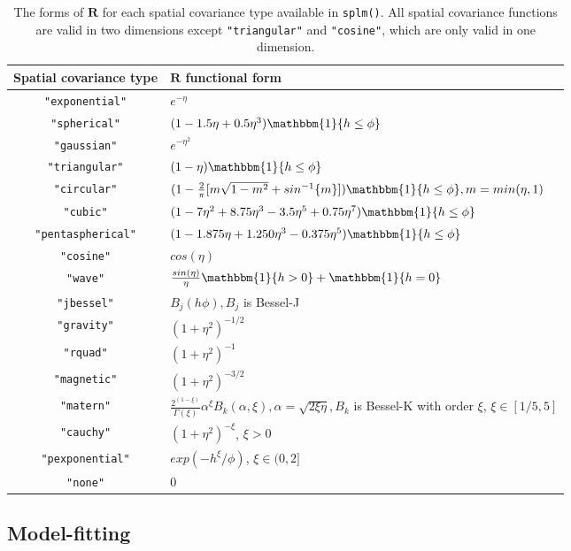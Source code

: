\documentclass[10pt,letterpaper]{article}
\begin{document}
\begin{table}
  \centering
  \begin{tabular}{c|l}
  \hline
  Spatial covariance type & $\mathbf{R}$ functional form \\
  \hline
  \texttt{"exponential"} & $e^{-\eta}$ \\
  \texttt{"spherical"} & $(1 - 1.5\eta + 0.5\eta^3)\mathbbm{1}\{h \leq \phi \}$ \\
  \texttt{"gaussian"} & $e^{-\eta^2}$ \\
  \texttt{"triangular"} & $(1 - \eta)\mathbbm{1}\{h \leq \phi \}$ \\
  \texttt{"circular"} & $(1 - \frac{2}{\pi}[m\sqrt{1 - m^2} + sin^{-1}\{m\}])\mathbbm{1}\{h \leq \phi \}, m = min(\eta, 1)$ \\
  \texttt{"cubic"} & $(1 - 7\eta^2 + 8.75\eta^3 - 3.5\eta^5 + 0.75 \eta^7)\mathbbm{1}\{h \leq \phi \}$ \\
  \texttt{"pentaspherical"} & $(1 - 1.875\eta + 1.250\eta^3 - 0.375\eta^5)\mathbbm{1}\{h \leq \phi \}$ \\
  \texttt{"cosine"} & $ cos(\eta) $ \\
  \texttt{"wave"} & $\frac{sin(\eta)}{\eta}\mathbbm{1}\{h > 0 \} + \mathbbm{1}\{h = 0 \}$ \\
  \texttt{"jbessel"} & $B_j(h\phi), B_j$ is Bessel-J \\
  \texttt{"gravity"} & $(1 + \eta^2)^{-1/2}$ \\
  \texttt{"rquad"} & $(1 + \eta^2)^{-1}$ \\
  \texttt{"magnetic"} & $(1 + \eta^2)^{-3/2}$ \\
  \texttt{"matern"} & $\frac{2^{(1 - \xi)}}{\Gamma(\xi)} \alpha^\xi B_k(\alpha, \xi), \alpha = \sqrt{2\xi \eta}, B_k$ is Bessel-K with order $\xi$, $\xi \in [1/5, 5]$ \\
  \texttt{"cauchy"} & $(1 + \eta^2)^{-\xi}$, $\xi > 0$ \\
  \texttt{"pexponential"} & $exp(-h^\xi / \phi)$, $\xi \in (0, 2]$ \\
  \texttt{"none"} & $0$ \\
  \hline
  \end{tabular}
  \caption{The forms of $\mathbf{R}$ for each spatial covariance type available in \texttt{splm()}. All spatial covariance functions are valid in two dimensions except \texttt{"triangular"} and \texttt{"cosine"}, which are only valid in one dimension.}
  \label{tab:cov_splm}
\end{table}

\hypertarget{subsec:estimation}{%
\subsection{Model-fitting}\label{subsec:estimation}}
\end{document}

